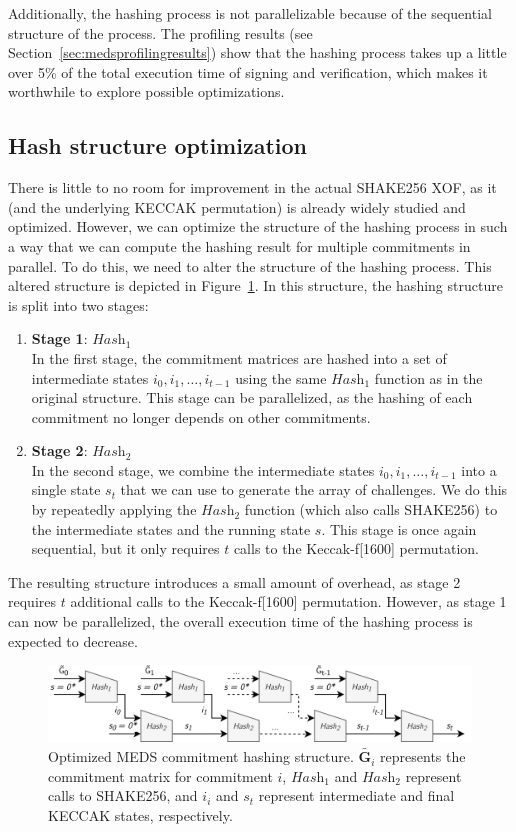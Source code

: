 \documentclass[11pt,a4paper]{report}
\theoremstyle{definition}
\begin{document}
Additionally, the hashing process is not parallelizable because of the sequential structure of the process. The profiling results (see Section~\ref{sec:medsprofilingresults}) show that the hashing process takes up a little over 5\% of the total execution time of signing and verification, which makes it worthwhile to explore possible optimizations.

\subsection{Hash structure optimization}
There is little to no room for improvement in the actual SHAKE256 XOF, as it (and the underlying KECCAK permutation) is already widely studied and optimized. However, we can optimize the structure of the hashing process in such a way that we can compute the hashing result for multiple commitments in parallel. To do this, we need to alter the structure of the hashing process. This altered structure is depicted in Figure~\ref{fig:hashstructureopt}. In this structure, the hashing structure is split into two stages:
\begin{enumerate}
  \item \textbf{Stage 1}: $\textit{Hash}_1$\\
        In the first stage, the commitment matrices are hashed into a set of intermediate states $i_0, i_1, \ldots, i_{t-1}$ using the same $\textit{Hash}_1$ function as in the original structure. This stage can be parallelized, as the hashing of each commitment no longer depends on other commitments.
        \pagebreak
  \item \textbf{Stage 2}: $\textit{Hash}_2$\\
        In the second stage, we combine the intermediate states $i_0, i_1, \ldots, i_{t-1}$ into a single state $s_t$ that we can use to generate the array of challenges. We do this by repeatedly applying the $\textit{Hash}_2$ function (which also calls SHAKE256) to the intermediate states and the running state $s$. This stage is once again sequential, but it only requires $t$ calls to the Keccak-f[1600] permutation.
\end{enumerate}
The resulting structure introduces a small amount of overhead, as stage 2 requires $t$ additional calls to the Keccak-f[1600] permutation. However, as stage 1 can now be parallelized, the overall execution time of the hashing process is expected to decrease.

\begin{figure}
  \centering
  \includegraphics[width=\textwidth]{hash/hash_struct_par.png}
  \caption{Optimized MEDS commitment hashing structure. $\tilde{\textbf{G}_i}$ represents the commitment matrix for commitment $i$, $\textit{Hash}_1$ and $\textit{Hash}_2$ represent calls to SHAKE256, and $i_i$ and $s_t$ represent intermediate and final KECCAK states, respectively.}
  \label{fig:hashstructureopt}
\end{figure}
\end{document}
